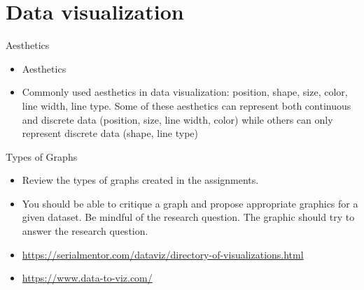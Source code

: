 \documentclass[10pt,handout]{beamer}\usepackage[]{graphicx}\usepackage[]{color}
\begin{document}
\section{Data visualization}

\begin{frame}{Aesthetics}
	\begin{itemize}
		\setlength\itemsep{.51em}
		\item Aesthetics
		\pause 
		\item Commonly used aesthetics in data visualization: position, shape, size, color, line width, line type. Some of these aesthetics can represent both continuous and discrete data (position, size, line width, color) while others can only represent discrete data (shape, line type)	
	\end{itemize}
\end{frame}

\begin{frame}{Types of Graphs}
	\begin{itemize}
		\item Review the types of graphs created in the assignments.
		\item You should be able to critique a graph and propose appropriate graphics for a given dataset. Be mindful of the research question. The graphic should try to answer the research question. 
		\item \url{https://serialmentor.com/dataviz/directory-of-visualizations.html}
		\item \url{https://www.data-to-viz.com/}
	\end{itemize}
\end{frame}
\end{document}
